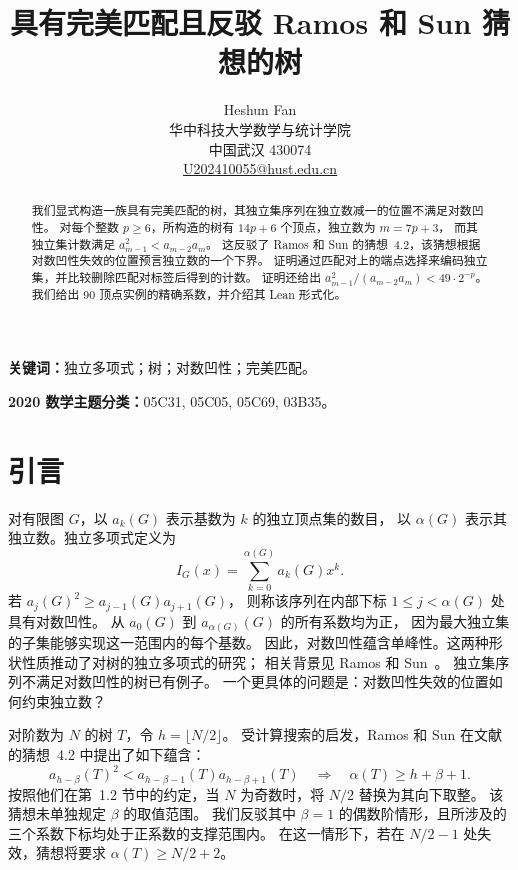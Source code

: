 \documentclass[UTF8,11pt,a4paper,fontset=fandol]{ctexart}
\title{具有完美匹配且反驳 Ramos 和 Sun 猜想的树}
\author{Heshun Fan\\
{\small 华中科技大学数学与统计学院}\\
{\small 中国武汉 430074}\\
{\small \href{mailto:U202410055@hust.edu.cn}{U202410055@hust.edu.cn}}}
\date{}
\theoremstyle{remark}
\numberwithin{equation}{section}
\begin{document}
\maketitle

\begin{abstract}
我们显式构造一族具有完美匹配的树，其独立集序列在独立数减一的位置不满足对数凹性。
对每个整数 $p\geq6$，所构造的树有 $14p+6$ 个顶点，独立数为 $m=7p+3$，
而其独立集计数满足 $a_{m-1}^2<a_{m-2}a_m$。
这反驳了 Ramos 和 Sun 的猜想~4.2，该猜想根据对数凹性失效的位置预言独立数的一个下界。
证明通过匹配对上的端点选择来编码独立集，并比较删除匹配对标签后得到的计数。
证明还给出 $a_{m-1}^2/(a_{m-2}a_m)<49\cdot2^{-p}$。
我们给出 90 顶点实例的精确系数，并介绍其 Lean 形式化。
\end{abstract}

\begingroup\small
\noindent\textbf{关键词：}独立多项式；树；对数凹性；完美匹配。\par
\noindent\textbf{2020 数学主题分类：}05C31, 05C05, 05C69, 03B35。\par
\endgroup

\section{引言}\label{sec:introduction}

对有限图 $G$，以 $a_k(G)$ 表示基数为 $k$ 的独立顶点集的数目，
以 $\alpha(G)$ 表示其独立数。独立多项式定义为
\[
 I_G(x)=\sum_{k=0}^{\alpha(G)}a_k(G)x^k.
\]
若 $a_j(G)^2\geq a_{j-1}(G)a_{j+1}(G)$，
则称该序列在内部下标 $1\leq j<\alpha(G)$ 处具有对数凹性。
从 $a_0(G)$ 到 $a_{\alpha(G)}(G)$ 的所有系数均为正，
因为最大独立集的子集能够实现这一范围内的每个基数。
因此，对数凹性蕴含单峰性。这两种形状性质推动了对树的独立多项式的研究；
相关背景见 Ramos 和 Sun~\cite[第~2.1 节]{RamosSun2025}。
独立集序列不满足对数凹性的树已有例子\cite{KadrawiLevit2023}。
一个更具体的问题是：对数凹性失效的位置如何约束独立数？

对阶数为 $N$ 的树 $T$，令 $h=\lfloor N/2\rfloor$。
受计算搜索的启发，Ramos 和 Sun 在文献~\cite{RamosSun2025} 的猜想~4.2 中提出了如下蕴含：
\begin{equation}
 a_{h-\beta}(T)^2<a_{h-\beta-1}(T)a_{h-\beta+1}(T)
 \quad\Longrightarrow\quad
 \alpha(T)\geq h+\beta+1.
 \label{eq:conjecture}
\end{equation}
按照他们在第~1.2 节中的约定，当 $N$ 为奇数时，将 $N/2$ 替换为其向下取整。
该猜想未单独规定 $\beta$ 的取值范围。
我们反驳其中 $\beta=1$ 的偶数阶情形，且所涉及的三个系数下标均处于正系数的支撑范围内。
在这一情形下，若在 $N/2-1$ 处失效，猜想将要求 $\alpha(T)\geq N/2+2$。
\end{document}
